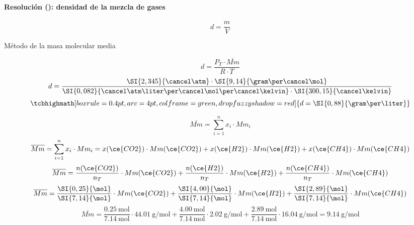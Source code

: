\begin{frame}
    \frametitle{\ejerciciocmd}
    \framesubtitle{Resolución (): densidad de la mezcla de gases}
    $$
        d = \frac{m}{V}
    $$
    \begin{block}{Método de la masa molecular media}
        \begin{overprint}
                $$
                    d = \frac{P_T\cdot\overline{Mm}}{R\cdot T}
                $$
                $$
                    d = \frac{\SI{2,345}{\cancel\atm}\cdot\SI{9,14}{\gram\per\cancel\mol}}{\SI{0,082}{\cancel\atm\liter\per\cancel\mol\per\cancel\kelvin}\cdot\SI{300,15}{\cancel\kelvin}}
                $$
                $$
                    \tcbhighmath[boxrule=0.4pt,arc=4pt,colframe=green,drop fuzzy shadow=red]{d = \SI{0,88}{\gram\per\liter}}
                $$
        \end{overprint}
        \begin{overprint}
                $$
                    \overline{Mm} = \sum_{i=1}^{n}x_i\cdot Mm_i
                $$
                $$
                    \overline{Mm} = \sum_{i=1}^{n}x_i\cdot Mm_i = x(\ce{CO2})\cdot Mm(\ce{CO2}) + x(\ce{H2})\cdot Mm(\ce{H2}) + x(\ce{CH4})\cdot Mm(\ce{CH4})
                $$
                $$
                    \overline{Mm} = \frac{n(\ce{CO2})}{n_T}\cdot Mm(\ce{CO2}) + \frac{n(\ce{H2})}{n_T}\cdot Mm(\ce{H2}) + \frac{n(\ce{CH4})}{n_T}\cdot Mm(\ce{CH4})
                $$
                $$
                    \overline{Mm} = \frac{\SI{0,25}{\mol}}{\SI{7,14}{\mol}}\cdot Mm(\ce{CO2}) + \frac{\SI{4,00}{\mol}}{\SI{7,14}{\mol}}\cdot Mm(\ce{H2}) + \frac{\SI{2,89}{\mol}}{\SI{7,14}{\mol}}\cdot Mm(\ce{CH4})
                $$
                $$
                    \overline{Mm} = \frac{\SI{0,25}{\mol}}{\SI{7,14}{\mol}}\cdot\SI{44,01}{\gram\per\mol} + \frac{\SI{4,00}{\mol}}{\SI{7,14}{\mol}}\cdot\SI{2,02}{\gram\per\mol} + \frac{\SI{2,89}{\mol}}{\SI{7,14}{\mol}}\cdot\SI{16,04}{\gram\per\mol}
                    =
                    \SI{9,14}{\gram\per\mol}
                $$
        \end{overprint}
    \end{block}
\end{frame}
